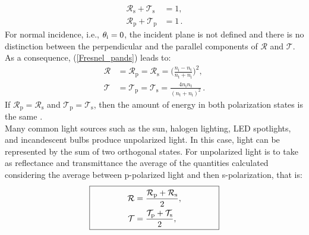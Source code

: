 \begin{equation}
\begin{split}
\mathcal{R}_\textrm{s}+\mathcal{T}_\textrm{s} &= 1,\\
\mathcal{R}_\textrm{p}+\mathcal{T}_\textrm{p} &=1\,.
\end{split}
\end{equation}
For normal incidence, i.e., $\theta_\textrm{i} = 0$, the incident plane is not defined and there is no distinction between the perpendicular and the parallel components of $\mathcal{R}$ and $\mathcal{T}$. As a consequence, (\ref{Fresnel_pands}) leads to:
\begin{equation}\label{eq:fresnel_pands2}
\begin{split}
\mathcal{R} &= \mathcal{R}_\textrm{p} = \mathcal{R}_\textrm{s} = \Bigg(\frac{n_\textrm{i}-n_\textrm{t}}{n_\textrm{t}+n_\textrm{i}}\Bigg)^2, \\
\mathcal{T} &= \mathcal{T}_\textrm{p} = \mathcal{T}_\textrm{s} = \frac{4n_\textrm{i} n_\textrm{t}}{(n_\textrm{t}+n_\textrm{i})^2}\,.
\end{split}
\end{equation}
\indent %
If $\mathcal{R}_\textrm{p} = \mathcal{R}_\textrm{s}$ and $\mathcal{T}_\textrm{p} = \mathcal{T}_\textrm{s}$, then the amount of energy in both polarization states is the same \cite{hecht1998hecht}.\\ \indent
Many common light sources such as the sun, halogen lighting, LED spotlights, and incandescent bulbs produce unpolarized light. 
In this case, light can be represented by the sum of two orthogonal states. For unpolarized light is to take as reflectance and transmittance the average of the quantities calculated considering the average between p-polarized light and then s-polarization, that is:
\begin{equation}
\fbox{\begin{minipage}{15em}
\begin{equation*}\begin{split}
\mathcal{R} &= \frac{\mathcal{R}_\textrm{p}+ \mathcal{R}_\textrm{s}}{2},\\
\mathcal{T} &= \frac{\mathcal{T}_\textrm{p}+ \mathcal{T}_\textrm{s}}{2},
\end{split}
\label{eq:RandTin2D}
\end{equation*}
\end{minipage}}
\end{equation}

